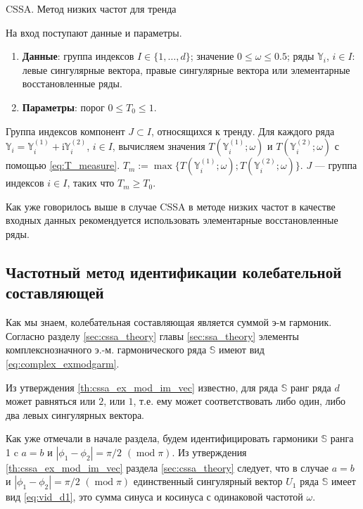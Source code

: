 \documentclass[specialist,
               substylefile = spbu.rtx,
               subf,href,colorlinks=true, 12pt]{disser}
\def\mod{\mathop{\mathrm{mod}}}
\newcommand{\I}{\mathrm{i}}
\begin{document}
\begin{algorithm}[!hhh]
\caption{CSSA. Метод низких частот для тренда}
\label{alg:freqcssa}
\begin{algorithmic}[1]
\REQUIRE На вход поступают данные и параметры.
\begin{enumerate}
\item \textbf{Данные}: группа индексов $I \in \{1,\ldots,d\}$; значение  $0 \leqslant  \omega \leqslant 0.5$; ряды $\mathbb{Y}_i$, $i \in I$: левые сингулярные вектора,
правые сингулярные вектора или элементарные восстановленные ряды.
\item \textbf{Параметры}: порог $0 \leqslant T_0 \leqslant 1$.
\end{enumerate}
\ENSURE Группа индексов компонент $J \subset I$, относящихся к тренду.
\STATE  Для каждого ряда $\mathbb{Y}_i = \mathbb{Y}^{(1)}_i + \I \mathbb{Y}^{(2)}_i $, $i \in I$, вычисляем значения $T(\mathbb{Y}^{(1)}_i; \omega)$ и $T(\mathbb{Y}^{(2)}_i; \omega)$ с помощью \eqref{eq:T_measure}. $T_m := \max \{T(\mathbb{Y}^{(1)}_i; \omega); T(\mathbb{Y}^{(2)}_i; \omega)\}$.
\STATE $J$ --- группа индексов $i \in I$, таких что $T_m \geqslant T_0$.
\end{algorithmic}
\end{algorithm}

Как уже говорилось выше в случае CSSA в методе низких частот в качестве входных данных рекомендуется использовать элементарные восстановленные ряды. 

\subsection{Частотный метод идентификации колебательной составляющей}
\label{sec:freq_cssa}
Как мы знаем, колебательная составляющая является суммой э-м гармоник.
Согласно разделу \ref{sec:cssa_theory} главы \ref{sec:ssa_theory} элементы комплекснозначного э.-м. гармонического ряда $\mathbb{S}$ имеют вид \eqref{eq:complex_exmodgarm}.

Из утверждения \ref{th:cssa_ex_mod_im_vec} известно, для ряда $\mathbb{S}$ ранг ряда $d$ может равняться или $2$, или $1$, т.е. ему может соответствовать либо один, либо два левых сингулярных вектора. 

Как уже отмечали в начале раздела, будем идентифицировать гармоники $\mathbb{S}$ ранга 1 c $a=b$ и $|\phi_1 - \phi_2| = \pi/2 \,\,(\mod \pi)$.
 Из утверждения \ref{th:cssa_ex_mod_im_vec} раздела \ref{sec:cssa_theory} следует, что в случае $a=b$ и $|\phi_1 - \phi_2| = \pi/2 \,\,(\mod \pi)$ единственный сингулярный вектор $U_1$ ряда $\mathbb{S}$ имеет вид \eqref{eq:vid_d1}, это сумма синуса и косинуса с одинаковой частотой $\omega$.
\end{document}
